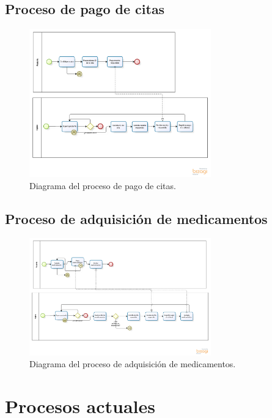     \subsection{Proceso de pago de citas}
\begin{figure}[htbp!]
		\centering
			\includegraphics[width=0.7\textwidth]{images/Proceso_pago_cita}
		\caption{Diagrama del proceso de pago de citas.}
	\end{figure}
    
    \subsection{Proceso de adquisición de medicamentos}
\begin{figure}[htbp!]
		\centering
			\includegraphics[width=0.7\textwidth]{images/Proceso_medicamentos}
		\caption{Diagrama del proceso de adquisición de medicamentos.}
	\end{figure}
\newpage
\section{Procesos actuales}

